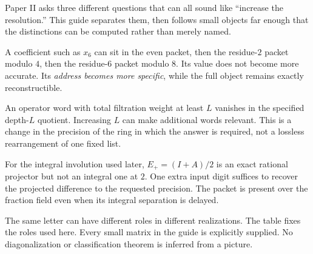 
Paper II asks three different questions that can all sound like ``increase the resolution.'' This guide separates them, then follows small objects far enough that the distinctions can be computed rather than merely named.


A coefficient such as $x_6$ can sit in the even packet, then the residue-$2$ packet modulo $4$, then the residue-$6$ packet modulo $8$. Its value does not become more accurate. Its \emph{address becomes more specific}, while the full object remains exactly reconstructible.

An operator word with total filtration weight at least $L$ vanishes in the specified depth-$L$ quotient. Increasing $L$ can make additional words relevant. This is a change in the precision of the ring in which the answer is required, not a lossless rearrangement of one fixed list.

For the integral involution used later, $E_+=(I+A)/2$ is an exact rational projector but not an integral one at $2$. One extra input digit suffices to recover the projected difference to the requested precision. The packet is present over the fraction field even when its integral separation is delayed.


The same letter can have different roles in different realizations. The table fixes the roles used here. Every small matrix in the guide is explicitly supplied. No diagonalization or classification theorem is inferred from a picture.

